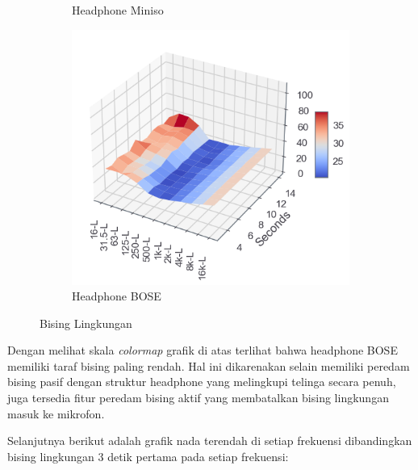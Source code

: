 \documentclass[12pt,]{article}
\begin{document}
\begin{itemize}
\begin{figure}[!ht]
\begin{subfigure}[b]{0.3\textwidth}
				\caption{Headphone Miniso}
			\end{subfigure}
			\begin{subfigure}[b]{0.3\textwidth}
				\includegraphics[width=\textwidth]{images/graph/nounitbose}
				\caption{Headphone BOSE}
			\end{subfigure}
			\caption{Bising Lingkungan}
		\end{figure}

		Dengan melihat skala \textit{colormap} grafik di atas terlihat bahwa headphone BOSE memiliki taraf bising paling rendah.
		Hal ini dikarenakan selain memiliki peredam bising pasif dengan struktur headphone yang melingkupi telinga secara penuh,
		juga tersedia fitur peredam bising aktif yang membatalkan bising lingkungan masuk ke mikrofon.

		\newpage
		Selanjutnya berikut adalah grafik nada terendah di setiap frekuensi dibandingkan bising lingkungan 3 detik pertama pada setiap frekuensi:


\end{itemize}
\end{document}
